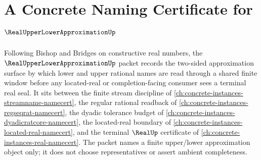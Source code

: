 \chapter{A Concrete Naming Certificate for $\RealUpperLowerApproximationUp$}
\label{ch:concrete-instances-real-upper-lower-approximation-namecert}

Following Bishop and Bridges on constructive real numbers, the $\RealUpperLowerApproximationUp$ packet records the two-sided approximation surface by which lower and upper rational names are read through a shared finite window before any located-real or completion-facing consumer sees a terminal real seal. It sits between the finite stream discipline of \autoref{ch:concrete-instances-streamname-namecert}, the regular rational readback of \autoref{ch:concrete-instances-regseqrat-namecert}, the dyadic tolerance budget of \autoref{ch:concrete-instances-dyadicratcore-namecert}, the located-real boundary of \autoref{ch:concrete-instances-located-real-namecert}, and the terminal $\RealUp$ certificate of \autoref{ch:concrete-instances-real-namecert}. The packet names a finite upper/lower approximation object only; it does not choose representatives or assert ambient completeness.

